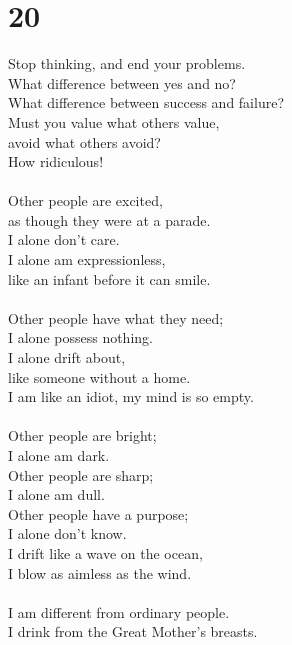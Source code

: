 \documentclass[b5paper, 12pt, oneside]{book}
\begin{document}
\chapter*{20}
Stop thinking, and end your problems.\\
What difference between yes and no?\\
What difference between success and failure?\\
Must you value what others value,\\
avoid what others avoid?\\
How ridiculous!\\
\\
Other people are excited,\\
as though they were at a parade.\\
I alone don't care.\\
I alone am expressionless,\\
like an infant before it can smile.\\
\\
Other people have what they need;\\
I alone possess nothing.\\
I alone drift about,\\
like someone without a home.\\
I am like an idiot, my mind is so empty.\\
\\
Other people are bright;\\
I alone am dark.\\
Other people are sharp;\\
I alone am dull.\\
Other people have a purpose;\\
I alone don't know.\\
I drift like a wave on the ocean,\\
I blow as aimless as the wind.\\
\\
I am different from ordinary people.\\
I drink from the Great Mother's breasts.\\
\end{document}
